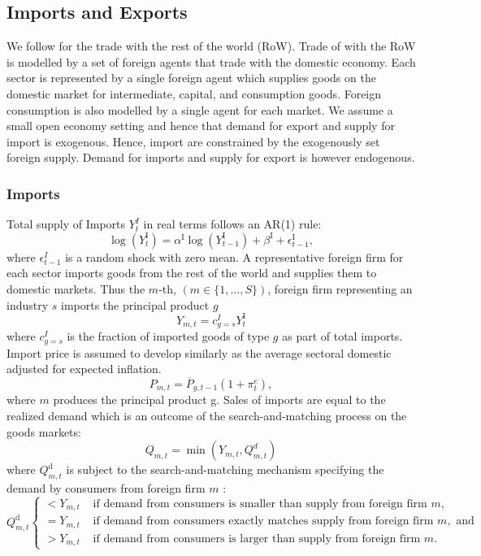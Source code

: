 \subsection{Imports and Exports}
We follow \cite{poledna_economic_2019} for the trade with the rest of the world (RoW). Trade of with the RoW is modelled by a set of foreign agents that trade with the domestic economy. Each sector is represented by a single foreign agent which supplies goods on the domestic market for intermediate, capital, and consumption goods. Foreign consumption is also modelled by a single agent for each market. We assume a small open economy setting and hence that demand for export and supply for import is exogenous. Hence, import are constrained by the exogenously set foreign supply. Demand for imports and supply for export is however endogenous. 
\subsubsection{Imports}
Total supply of Imports $Y^I_t$ in real terms follows an AR(1) rule:
\begin{equation}
\log \left(Y^{\mathrm{I}}_t\right)=\alpha^{\mathrm{I}} \log \left(Y^{\mathrm{I}}_{t-1}\right)+\beta^{\mathrm{I}}+\epsilon^{\mathrm{I}}_{t-1}, \label{eq:importsar}
\end{equation}
where $\epsilon^I_{t-1}$ is a random shock with zero mean. A representative foreign firm for each sector imports goods from the rest of the world and supplies them to domestic markets. Thus the $m$-th, $(m\in\{1, \ldots, S\})$, foreign firm representing an industry $s$ imports the principal product $g$
\begin{equation}
    Y_{m,t}=c_{g=s}^I Y^{\mathrm{I}}_t
\end{equation}
where $c_{g=s}^I$ is the fraction of imported goods of type $g$ as part of total imports. Import price is assumed to develop similarly as the average sectoral domestic adjusted for expected inflation.
\begin{equation}
    P_{m,t}=\overline{P}_{g,t-1} (1+\pi^e_t),
\end{equation}
where $m$ produces the principal product g. Sales of imports are equal to the realized demand which is an outcome of the search-and-matching process on the goods markets:
\begin{equation}
    Q_{m,t}=\min \left(Y_{m,t}, Q_{m,t}^d\right)
\end{equation}
where $Q_{m,t}^{\mathrm{d}}$ is subject to the search-and-matching mechanism specifying the demand by consumers from foreign firm $m$ :
\begin{equation}
    Q_{m,t}^{\mathrm{d}} \begin{cases}<Y_{m,t} & \text { if demand from consumers is smaller than supply from foreign firm } m, \\ =Y_{m,t} & \text { if demand from consumers exactly matches supply from foreign firm } m, \text { and } \\ >Y_{m,t} & \text { if demand from consumers is larger than supply from foreign firm } m .\end{cases}
\end{equation}
